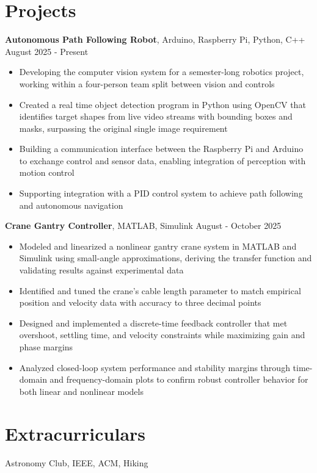 \documentclass[11pt]{article}
\begin{document}
\section*{Projects}

\textbf{Autonomous Path Following Robot}, Arduino, Raspberry Pi, Python, C++  \hfill August 2025 - Present
\begin{itemize}
  \item Developing the computer vision system for a semester-long robotics project, working within a four-person team split between vision and controls
  \item Created a real time object detection program in Python using OpenCV that identifies target shapes from live video streams with bounding boxes and masks, surpassing the original single image requirement
  \item Building a communication interface between the Raspberry Pi and Arduino to exchange control and sensor data, enabling integration of perception with motion control
  \item Supporting integration with a PID control system to achieve path following and autonomous navigation
\end{itemize}

\vspace{4pt}

\textbf{Crane Gantry Controller}, MATLAB, Simulink  \hfill August - October 2025
\begin{itemize}
  \item Modeled and linearized a nonlinear gantry crane system in MATLAB and Simulink using small-angle approximations, deriving the transfer function and validating results against experimental data
  \item Identified and tuned the crane's cable length parameter to match empirical position and velocity data with accuracy to three decimal points
  \item Designed and implemented a discrete-time feedback controller that met overshoot, settling time, and velocity constraints while maximizing gain and phase margins
  \item Analyzed closed-loop system performance and stability margins through time-domain and frequency-domain plots to confirm robust controller behavior for both linear and nonlinear models
\end{itemize}

\section*{Extracurriculars}
\small Astronomy Club, IEEE, ACM, Hiking
\end{document}
